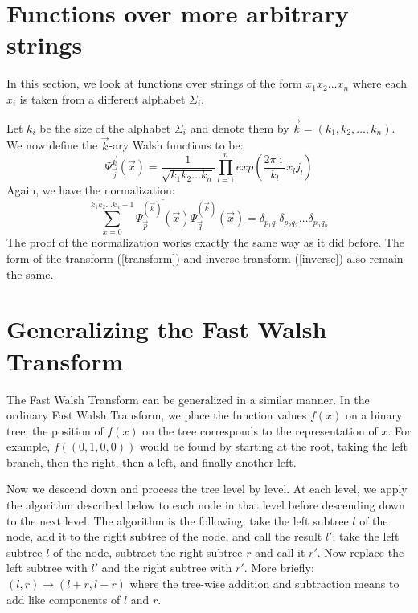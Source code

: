 \section{Functions over more arbitrary strings}
In this section, we look at functions over strings of the form
$x_1 x_2 \ldots x_n$ where each $x_i$ is taken from a different alphabet
$\Sigma_i$.  

Let $k_i$ be the size of the alphabet $\Sigma_i$ and denote
them by $\vec k=(k_1,k_2,\ldots,k_n)$.
We now define the $\vec k$-ary Walsh functions to be:
\begin{equation}
\Psi^{\vec{k}}_{\vec j}(\vec{x})=
	\frac{1}{\sqrt{k_1 k_2 \ldots k_n}}
	\prod_{l=1}^n {exp(\frac{2 \pi \imath}{k_l} x_l j_l)}
\end{equation}
Again, we have the normalization:
\begin{equation}
\sum_{x=0}^{k_1 k_2 \ldots k_n -1}{ {\overline{\Psi^{(\vec{k})}_{\vec p}(\vec{x})}}
	\Psi^{(\vec{k})}_{\vec q}(\vec{x})}=
		\delta_{p_1 q_1} \delta_{p_2 q_2} \ldots
		\delta_{p_n q_n}
\end{equation}
The proof of the normalization works exactly the same way as it did
before.  The form of the transform (\ref{transform}) and inverse transform 
(\ref{inverse}) also remain the same.

\section{Generalizing the Fast Walsh Transform}
The Fast Walsh Transform can be generalized in a similar manner.
In the ordinary Fast Walsh Transform, we place the function values $f(x)$ on a
binary tree; the position of $f(x)$ on the tree corresponds to the
representation of $x$.  For example, $f((0,1,0,0))$ would be found by
starting at the root, taking the left branch, then the right, then a
left, and finally another left.

Now we descend down and process the tree level by level.  At each level,
we apply the algorithm described below to each node in that level before
descending down to the next level.  The algorithm is the following:
take the left subtree $l$ of the node, add it to the right subtree
of the node, and call the result $l'$; take the left subtree $l$ of
the node, subtract the right subtree $r$  and call it $r'$.  Now replace
the left subtree with $l'$ and the right subtree with $r'$.
More briefly: $(l,r) \rightarrow (l + r,l - r)$ where the tree-wise
addition and subtraction means to add like components of $l$ and $r$.

